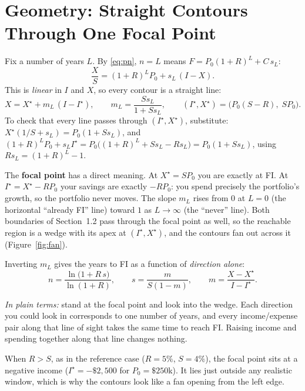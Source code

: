 \documentclass[11pt,letterpaper]{article}
\newcommand{\plain}[1]{\par\smallskip\noindent\textcolor{mpgrey}{\textit{In plain terms:} #1}\par\smallskip}
\begin{document}
\section{Geometry: Straight Contours Through One Focal Point}
\label{sec:geometry}

Fix a number of years $L$. By \eqref{eq:pn}, $n = L$ means $F = P_0(1+R)^L + C\,s_L$:
\begin{equation}
\frac{X}{S} = (1+R)^L P_0 + s_L\,(I - X).
\end{equation}
This is \emph{linear} in $I$ and $X$, so every contour is a straight line:
\begin{equation}
X = X^\star + m_L\,(I - I^\star), \qquad m_L = \frac{S s_L}{1 + S s_L}, \qquad
\boxed{(I^\star, X^\star) = \big(P_0(S - R),\; S P_0\big)}.
\label{eq:contour}
\end{equation}
To check that every line passes through $(I^\star, X^\star)$, substitute: $X^\star(1/S + s_L) = P_0(1 + S s_L)$, and $(1+R)^L P_0 + s_L I^\star = P_0\big((1+R)^L + S s_L - R s_L\big) = P_0(1 + S s_L)$, using $R s_L = (1+R)^L - 1$.

The \textbf{focal point} has a direct meaning. At $X^\star = SP_0$ you are exactly at FI. At $I^\star = X^\star - RP_0$ your savings are exactly $-RP_0$: you spend precisely the portfolio's growth, so the portfolio never moves. The slope $m_L$ rises from $0$ at $L = 0$ (the horizontal ``already FI'' line) toward $1$ as $L \to \infty$ (the ``never'' line). Both boundaries of Section~1.2 pass through the focal point as well, so the reachable region is a wedge with its apex at $(I^\star, X^\star)$, and the contours fan out across it (Figure~\ref{fig:fan}).

Inverting $m_L$ gives the years to FI as a function of \emph{direction alone}:
\begin{equation}
n = \frac{\ln\!\big(1 + R\,s\big)}{\ln(1+R)}, \qquad s = \frac{m}{S(1-m)}, \qquad m = \frac{X - X^\star}{I - I^\star}.
\label{eq:angle}
\end{equation}

\plain{stand at the focal point and look into the wedge. Each direction you could look in corresponds to one number of years, and every income/expense pair along that line of sight takes the same time to reach FI. Raising income and spending together along that line changes nothing.}

When $R > S$, as in the reference case ($R = 5\%$, $S = 4\%$), the focal point sits at a negative income ($I^\star = -\$2{,}500$ for $P_0 = \$250$k). It lies just outside any realistic window, which is why the contours look like a fan opening from the left edge.
\end{document}
